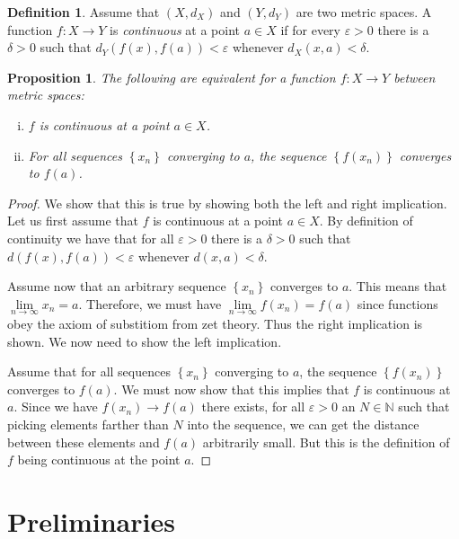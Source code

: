 \documentclass[a4paper]{report}
\newtheorem{prp}{Proposition}
\theoremstyle{definition}
\newtheorem{defn}{Definition}
\begin{document}
\begin{defn}
  Assume that $(X, d_{X})$ and $(Y, d_{Y})$ are two metric spaces. A function
  $f : X \rightarrow Y$ is \textit{continuous} at a point $a \in X$ if for
  every $\varepsilon > 0$ there is a $\delta > 0$ such that $d_{Y}(f(x), f(a))
  < \varepsilon$ whenever $d_{X}(x, a) < \delta$.
\end{defn}

\begin{prp}
  The following are equivalent for a function $f : X \rightarrow Y$ between metric spaces:
  \begin{enumerate}[(i)]
    \item $f$ is continuous at a point $a \in X$.
    \item For all sequences $\left\{ x_n \right\}$ converging to $a$, the sequence $\left\{ f(x_n) \right\}$ converges
      to $f(a)$.
  \end{enumerate}
\end{prp}

\begin{proof}
  We show that this is true by showing both the left and right implication.
  Let us first assume that $f$ is continuous at a point $a \in X$. By
  definition of continuity we have that for all $\varepsilon > 0$ there is a
  $\delta > 0$ such that $d(f(x), f(a)) < \varepsilon$ whenever $d(x, a) <
  \delta$.

  Assume now that an arbitrary sequence $\left\{ x_n \right\}$ converges to
  $a$. This means that $\lim\limits_{n\rightarrow\infty} x_n = a$.  Therefore,
  we must have $\lim\limits_{n\rightarrow\infty} f(x_n) = f(a)$ since functions
  obey the axiom of substitiom from zet theory. Thus the right implication is shown.
  We now need to show the left implication.

  Assume that for all sequences $\left\{ x_n \right\}$ converging to $a$, the
  sequence $\left\{ f(x_n) \right\}$ converges to $f(a)$.  We must now show
  that this implies that $f$ is continuous at $a$. Since we have $f(x_n) \rightarrow f(a)$
  there exists, for all $\varepsilon > 0$ an $N \in \mathbb{N}$ such that picking elements farther
  than $N$ into the sequence, we can get the distance between these elements and $f(a)$ arbitrarily small.
  But this is the definition of $f$ being continuous at the point $a$.
\end{proof}

\chapter{Preliminaries}
\end{document}
